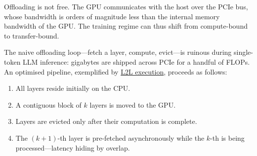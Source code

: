 \documentclass[11pt,a4paper]{article}
\theoremstyle{definition}
\theoremstyle{remark}
\theoremstyle{plain}
\newcommand{\grad}{\nabla}
\begin{document}
Offloading is not free. The GPU communicates with the host over the PCIe
bus, whose bandwidth is orders of magnitude less than the internal memory
bandwidth of the GPU. The training regime can thus shift from
compute-bound to transfer-bound.

\begin{center}
\end{center}


The naive offloading loop---fetch a layer, compute, evict---is ruinous
during single-token LLM inference: gigabytes are shipped across PCIe for
a handful of FLOPs. An optimised pipeline, exemplified by
\href{https://arxiv.org/abs/2002.05645}{L2L execution}, proceeds as
follows:

\begin{enumerate}[leftmargin=1.8em, itemsep=2pt]
    \item All layers reside initially on the CPU.
    \item A contiguous block of $k$ layers is moved to the GPU.
    \item Layers are evicted only after their computation is complete.
    \item The $(k{+}1)$-th layer is pre-fetched asynchronously while the
    $k$-th is being processed---latency hiding by overlap.
\end{enumerate}
\end{document}
